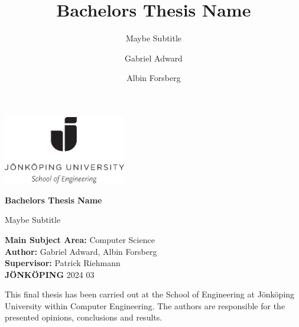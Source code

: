 \documentclass[bibliography=totocnumbered, 12pt]{scrreprt}
\title{Bachelors Thesis Name}
\subtitle{Maybe Subtitle}
\author{Gabriel Adward \and Albin Forsberg}
\begin{document}
\begin{titlepage}
        \includegraphics[width=0.4\textwidth]{./Images/ju.png}
        \vspace{2cm}
        
        \Huge \Huge
        \textbf{Bachelors Thesis Name}
        
        \vspace{0.5cm}
        \LARGE
        Maybe Subtitle
        
        \vfill
        \small
        \noindent
        \textbf{Main Subject Area:} Computer Science \\
        \textbf{Author:} Gabriel Adward, Albin Forsberg \\
        \textbf{Supervisor:} Patrick Riehmann \\
        \textbf{JÖNKÖPING} 2024 03

        \newpage
        \vfill 
        \small
        This final thesis has been carried out at the School of Engineering at Jönköping University within Computer Engineering. The authors are responsible for the presented opinions, conclusions and results.  

\end{titlepage}

\begin{abstract}
\end{abstract}

\tableofcontents









\cite{greenwade93}



\end{document}
